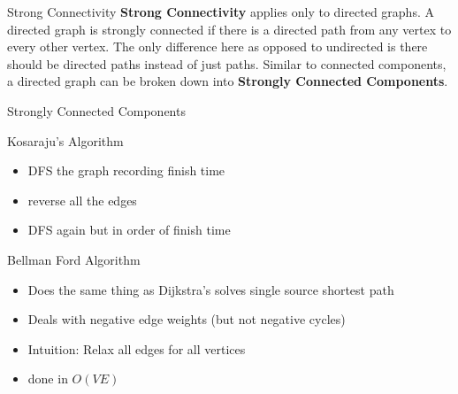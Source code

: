\documentclass{beamer}
\begin{document}
 \begin{frame}{Strong Connectivity}
     \textbf{Strong Connectivity} applies only to directed graphs. A directed graph is strongly connected if there is a directed path from any vertex to every other vertex. The only difference here as opposed to undirected is there should be directed paths instead of just paths. Similar to connected components, a directed graph can be broken down into \textbf{Strongly Connected Components}.
 \end{frame}
 \begin{frame}{Strongly Connected Components}
 \end{frame}
 
 \begin{frame}{Kosaraju's Algorithm}
     \begin{itemize}
         \item DFS the graph recording finish time
         \item reverse all the edges
         \item DFS again but in order of finish time 
     \end{itemize}
 \end{frame}
 
 \begin{frame}{Bellman Ford Algorithm}
    \begin{itemize}
        \item Does the same thing as Dijkstra's solves single source shortest path
        \item Deals with negative edge weights (but not negative cycles)
        \item Intuition: Relax all edges for all vertices
        \item done in $O(VE)$
    \end{itemize}
 \end{frame}
 
\end{document}
